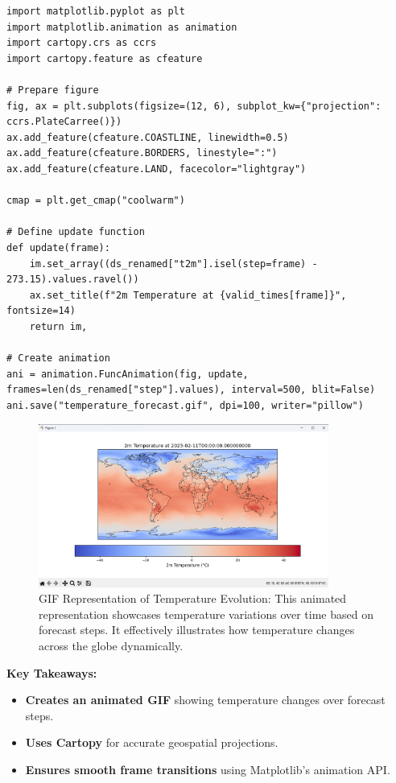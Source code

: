 \documentclass[a4paper,10pt]{article}
\begin{document}
\begin{verbatim}
import matplotlib.pyplot as plt
import matplotlib.animation as animation
import cartopy.crs as ccrs
import cartopy.feature as cfeature

# Prepare figure
fig, ax = plt.subplots(figsize=(12, 6), subplot_kw={"projection": ccrs.PlateCarree()})
ax.add_feature(cfeature.COASTLINE, linewidth=0.5)
ax.add_feature(cfeature.BORDERS, linestyle=":")
ax.add_feature(cfeature.LAND, facecolor="lightgray")

cmap = plt.get_cmap("coolwarm")

# Define update function
def update(frame):
    im.set_array((ds_renamed["t2m"].isel(step=frame) - 273.15).values.ravel())
    ax.set_title(f"2m Temperature at {valid_times[frame]}", fontsize=14)
    return im,

# Create animation
ani = animation.FuncAnimation(fig, update, frames=len(ds_renamed["step"].values), interval=500, blit=False)
ani.save("temperature_forecast.gif", dpi=100, writer="pillow")
\end{verbatim}

\begin{figure}[H]
    \centering
    \includegraphics[width=0.85\textwidth]{gif_temp.png}
    \caption{GIF Representation of Temperature Evolution: This animated representation showcases temperature variations over time based on forecast steps. It effectively illustrates how temperature changes across the globe dynamically.}
    \label{fig:gif_temp}
\end{figure}

\textbf{Key Takeaways:}
\begin{itemize}
    \item \textbf{Creates an animated GIF} showing temperature changes over forecast steps.
    \item \textbf{Uses Cartopy} for accurate geospatial projections.
    \item \textbf{Ensures smooth frame transitions} using Matplotlib’s animation API.
\end{itemize}
\end{document}
